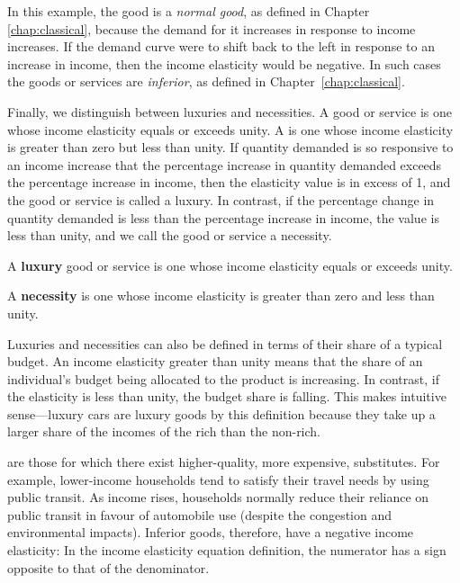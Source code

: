

\newhtmlpage

In this example, the good is a \textit{normal good}, as defined in Chapter~%
\ref{chap:classical}, because the demand for it increases in response to
income increases. If the demand curve were to shift back to the left in
response to an increase in income, then the income elasticity would be
negative. In such cases the goods or services are \textit{inferior}, as
defined in Chapter~\ref{chap:classical}.

Finally, we distinguish between luxuries and necessities. A %
 good or service is one whose income elasticity equals
or exceeds unity. A  is one whose income elasticity
is greater than zero but less than unity. If quantity demanded is so
responsive to an income increase that the percentage increase in quantity
demanded exceeds the percentage increase in income, then the elasticity
value is in excess of 1, and the good or service is called a luxury. In
contrast, if the percentage change in quantity demanded is less than the
percentage increase in income, the value is less than unity, and we call the
good or service a necessity.

\begin{DefBox}
A \textbf{luxury} good or service is one whose income elasticity equals or exceeds unity.
	
A \textbf{necessity} is one whose income elasticity is greater than zero and less than unity.
\end{DefBox}

Luxuries and necessities can also be defined in terms of their share of a
typical budget. An income elasticity greater than unity means that the share
of an individual's budget being allocated to the product is increasing. In
contrast, if the elasticity is less than unity, the budget share is falling.
This makes intuitive sense---luxury cars are luxury goods by this definition
because they take up a larger share of the incomes of the rich than the
non-rich.

\newhtmlpage

 are those for which there exist higher-quality,
more expensive, substitutes. For example, lower-income households tend to
satisfy their travel needs by using public transit. As income rises,
households normally reduce their reliance on public transit in favour of
automobile use (despite the congestion and environmental impacts). Inferior
goods, therefore, have a negative income elasticity: In the income
elasticity equation definition, the numerator has a sign opposite to that of
the denominator.

